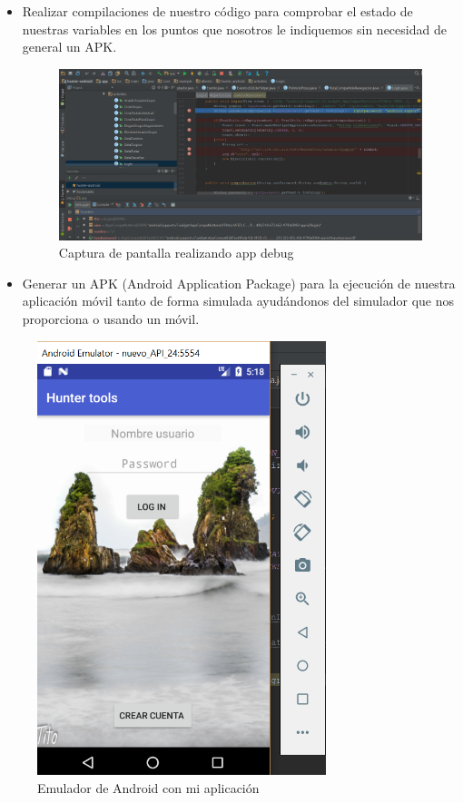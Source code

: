 \begin{itemize}
\item Realizar compilaciones  de nuestro código para comprobar el estado de nuestras variables en los puntos que nosotros le indiquemos sin necesidad de general un APK.
\begin{figure}[H]
		\centering
		\includegraphics[width=1.2\textwidth] {debug.png}
		\caption{Captura de pantalla realizando app debug }
	\end{figure}

\item Generar un APK (Android Application Package) para la ejecución de nuestra aplicación móvil tanto de forma simulada ayudándonos del simulador que nos proporciona o usando un móvil.
\end{itemize}
\begin{figure}[H]
		\centering
		\includegraphics[width=0.75\textwidth] {emulador.png}
		\caption{Emulador de Android con mi aplicación}
	\end{figure}
 
